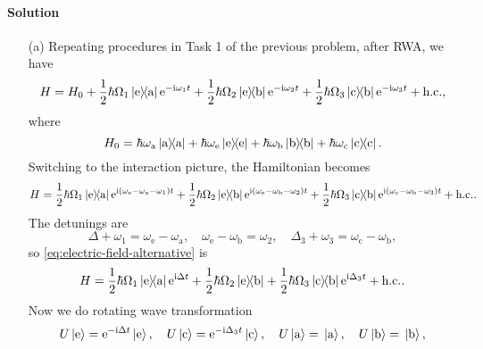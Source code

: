 \documentclass[hyperref, a4paper]{article}
\newcommand*{\ii}{\mathrm{i}}
\newcommand*{\ee}{\mathrm{e}}
\begin{document}
\paragraph{Solution} \begin{itemize}
\item[(a)] Repeating procedures in Task 1 of the previous problem, after RWA, we have 
\begin{equation}
    H = H_0 + \frac{1}{2} \hbar \Omega_1 \dyad*{\text{e}}{\text{a}} \ee^{- \ii \omega_1 t} 
    + \frac{1}{2} \hbar \Omega_2 \dyad*{\text{e}}{\text{b}} \ee^{- \ii \omega_2 t} 
    + \frac{1}{2} \hbar \Omega_3 \dyad*{\text{c}}{\text{b}} \ee^{- \ii \omega_3 t} + \text{h.c.},
\end{equation}  
where 
\begin{equation}
    H_0 = \hbar \omega_\text{a} \dyad*{\text{a}} + \hbar \omega_\text{e} \dyad*{\text{e}}
    + \hbar \omega_\text{b} \dyad*{\text{b}} + \hbar \omega_\text{c} \dyad*{\text{c}}.
\end{equation}
Switching to the interaction picture, the Hamiltonian becomes 
\begin{equation}
    H = \frac{1}{2} \hbar \Omega_1 \dyad*{\text{e}}{\text{a}} \ee^{ \ii ( \omega_\text{e} - \omega_\text{a} - \omega_1 ) t} 
    + \frac{1}{2} \hbar \Omega_2 \dyad*{\text{e}}{\text{b}} \ee^{ \ii (\omega_\text{e} - \omega_\text{b} - \omega_2 ) t} 
    + \frac{1}{2} \hbar \Omega_3 \dyad*{\text{c}}{\text{b}} \ee^{\ii ( \omega_\text{c} - \omega_\text{b} - \omega_3) t} + \text{h.c.}.
    \label{eq:ham-int-origin}
\end{equation}
The detunings are 
\begin{equation}
    \Delta + \omega_1 = \omega_\text{e} - \omega_\text{a}, \quad 
    \omega_\text{e} - \omega_\text{b} = \omega_2, \quad
    \Delta_3 + \omega_3 = \omega_\text{c} - \omega_\text{b},
\end{equation}
so \eqref{eq:electric-field-alternative} is 
\begin{equation}
    H = \frac{1}{2} \hbar \Omega_1 \dyad*{\text{e}}{\text{a}} \ee^{\ii \Delta t} 
    + \frac{1}{2} \hbar \Omega_2 \dyad*{\text{e}}{\text{b}} 
    + \frac{1}{2} \hbar \Omega_3 \dyad*{\text{c}}{\text{b}} \ee^{\ii \Delta_3 t} + \text{h.c.}.
\end{equation} 
Now we do rotating wave transformation 
\begin{equation}
    U \ket*{\text{e}} = \ee^{- \ii \Delta t} \ket*{\text{e}}, \quad 
    U \ket*{\text{c}} = \ee^{- \ii \Delta_3 t} \ket*{\text{c}}, \quad 
    U \ket*{\text{a}} = \ket*{\text{a}}, \quad U \ket*{\text{b}} = \ket*{\text{b}},

\end{equation}
\end{itemize}
\end{document}
